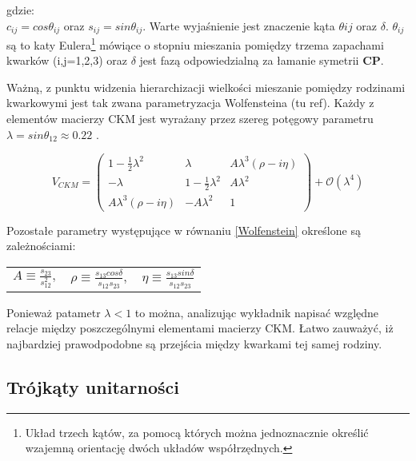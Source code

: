gdzie:\\
$c_{ij}=cos\theta_{ij}$ oraz $s_{ij}=sin\theta_{ij}$. Warte wyjaśnienie jest znaczenie kąta $\theta{ij}$ oraz $\delta$. $\theta_{ij}$ są to katy Eulera\footnote{Układ trzech kątów, za pomocą których można jednoznacznie określić wzajemną orientację dwóch układów współrzędnych.} mówiące o stopniu mieszania pomiędzy trzema zapachami kwarków (i,j=1,2,3) oraz $\delta$ jest fazą odpowiedzialną za łamanie symetrii \textbf{CP}.

Ważną, z punktu widzenia hierarchizacji wielkości mieszanie pomiędzy rodzinami kwarkowymi jest tak zwana parametryzacja Wolfensteina (tu ref). Każdy z elementów macierzy CKM jest wyrażany przez szereg potęgowy parametru $\lambda=sin\theta_{12}\approx 0.22$ .

\begin{equation}
V_{CKM}=\begin{pmatrix}
1-\frac{1}{2}\lambda^2& \lambda & A\lambda^3(\rho-i\eta)\\
-\lambda & 1-\frac{1}{2}\lambda^2 & A\lambda^2\\
 A\lambda^3(\rho-i\eta) & -A\lambda^2 & 1
\end{pmatrix} +\mathcal{O}(\lambda^4) 
\label{Wolfenstein}
\end{equation}

Pozostałe parametry występujące w równaniu \ref{Wolfenstein} określone są zależnościami:
\begin{center}
\begin{tabular}{l c r}
$A \equiv \frac{s_{23}}{s^2_{12}},$&  $\rho \equiv  \frac{s_{13}cos\delta}{s_{12}s_{23}},$ & $\eta  \equiv \frac{s_{13}sin\delta}{s_{12}s_{23}}$
\end{tabular}
\end{center}

Ponieważ patametr $\lambda <1$ to można, analizując wykładnik napisać względne relacje między poszczególnymi elementami macierzy CKM. Łatwo zauważyć, iż najbardziej prawodpodobne są przejścia między kwarkami tej samej rodziny.
\subsection{Trójkąty unitarności}


